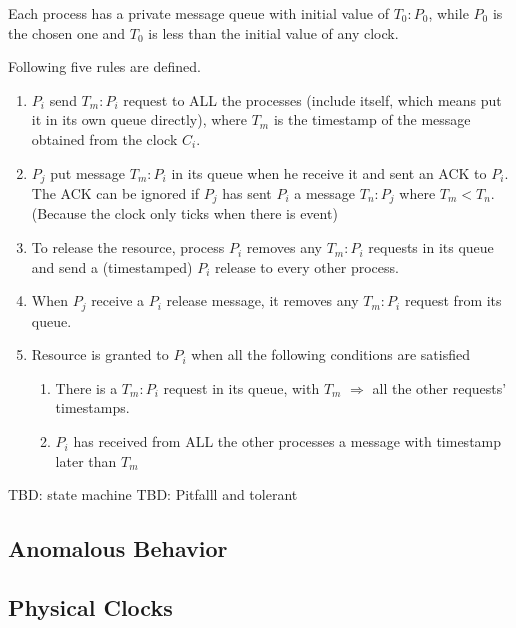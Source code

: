 \documentclass[12pt,a4paper,oneside]{article}
\begin{document}
Each process has a private message queue with initial value of $T_0:P_0$, while $P_0$ is the chosen one and
$T_0$ is less than the initial value of any clock.

Following five rules are defined.

\begin{enumerate}
  \item $P_i$ send $T_m:P_i$ request to ALL the processes (include itself, which means put it in its own queue directly),
  where $T_m$ is the timestamp of the message obtained from the clock $C_i$.
  \item $P_j$ put message $T_m:P_i$ in its queue when he receive it and sent an ACK to $P_i$. The ACK can be ignored if
  $P_j$ has sent $P_i$ a message $T_n:P_j$ where $T_m < T_n$. (Because the clock only ticks when there is event)
  \item To release the resource, process $P_i$ removes any $T_m:P_i$ requests in its queue and send a (timestamped) $P_i$
  release to every other process\cite{l}.
  \item When $P_j$ receive a $P_i$ release message, it removes any $T_m:P_i$ request from its queue.
  \item Resource is granted to $P_i$ when all the following conditions are satisfied
  \begin{enumerate}
    \item There is a $T_m:P_i$ request in its queue, with $T_m$ $\Rightarrow$ all the other requests' timestamps.
    \item $P_i$ has received from ALL the other processes a message with timestamp later than $T_m$
  \end{enumerate}
\end{enumerate}

TBD: state machine
TBD: Pitfalll and tolerant

\subsection{Anomalous Behavior}

\subsection{Physical Clocks}
\end{document}
